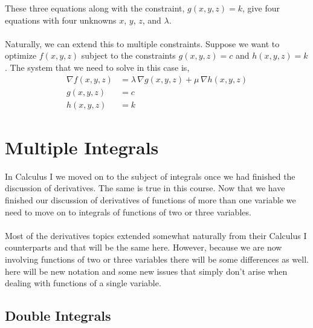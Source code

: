 \documentclass[10pt,reqno]{book}
\theoremstyle{definition}
\begin{document}
	These three equations along with the constraint, $ g(x,y,z) = k $, give four equations with four unknowns $ x $, $ y $, $ z $, and $ \lambda $.\\ \\
	Naturally, we can extend this to multiple constraints. Suppose we want to optimize $ f(x,y,z) $ subject to the constraints $ g(x,y,z) = c $ and $ h(x,y,z) = k $. The system that we need to solve in this case is,
	\begin{align*}
		\nabla f(x,y,z) &= \lambda \, \nabla g(x,y,z) + \mu \, \nabla h(x,y,z)\\
		g(x,y,z) &= c\\
		h(x,y,z) &= k
	\end{align*}
	
	\chapter{Multiple Integrals}
	
	In Calculus I we moved on to the subject of integrals once we had finished the discussion of derivatives. The same is true in this course. Now that we have finished our discussion of derivatives of functions of more than one variable we need to move on to integrals of functions of two or three variables.\\ \\
	Most of the derivatives topics extended somewhat naturally from their Calculus I counterparts and that will be the same here. However, because we are now involving functions of two or three variables there will be some differences as well.  here will be new notation and some new issues that simply don't arise when dealing with functions of a single variable.  
	
	\section{Double Integrals}
	
\end{document}
